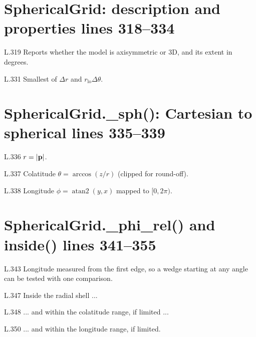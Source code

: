 \section*{\normalsize SphericalGrid: description and properties \hfill{\small\mdseries\color{gray}lines 318--334}}

\begin{lines}
\item[L.319] Reports whether the model is axisymmetric or 3D, and its extent in degrees.
\item[L.331] Smallest of $\Delta r$ and $r_\text{lo}\Delta\theta$.
\end{lines}
\section*{\normalsize SphericalGrid.\_sph(): Cartesian to spherical \hfill{\small\mdseries\color{gray}lines 335--339}}

\begin{lines}
\item[L.336] $r=|\mathbf{p}|$.
\item[L.337] Colatitude $\theta=\arccos(z/r)$ (clipped for round-off).
\item[L.338] Longitude $\phi=\operatorname{atan2}(y,x)$ mapped to $[0,2\pi)$.
\end{lines}
\section*{\normalsize SphericalGrid.\_phi\_rel() and inside() \hfill{\small\mdseries\color{gray}lines 341--355}}

\begin{lines}
\item[L.343] Longitude measured from the first edge, so a wedge starting at any angle can be tested with one comparison.
\item[L.347] Inside the radial shell ...
\item[L.348] ... and within the colatitude range, if limited ...
\item[L.350] ... and within the longitude range, if limited.
\end{lines}
